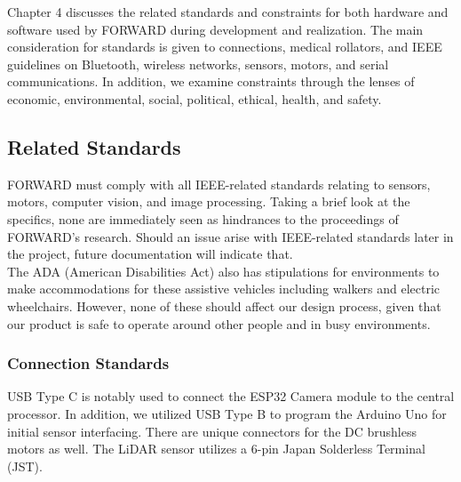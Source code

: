 \noindent Chapter 4 discusses the related standards and constraints for both hardware and software used by FORWARD during development and realization. The main consideration for standards is given to connections, medical rollators, and IEEE guidelines on Bluetooth, wireless networks, sensors, motors, and serial communications. In addition, we examine constraints through the lenses of economic, environmental, social, political, ethical, health, and safety.

\subsection{Related Standards}
\noindent FORWARD must comply with all IEEE-related standards relating to sensors, motors, computer vision, and image processing. Taking a brief look at the specifics, none are immediately seen as hindrances to the proceedings of FORWARD’s research. Should an issue arise with IEEE-related standards later in the project, future documentation will indicate that. \\

\noindent The ADA (American Disabilities Act) also has stipulations for environments to make accommodations for these assistive vehicles including walkers and electric wheelchairs. However, none of these should affect our design process, given that our product is safe to operate around other people and in busy environments.

\subsubsection{Connection Standards}
\noindent USB Type C is notably used to connect the ESP32 Camera module to the central processor. In addition, we utilized USB Type B to program the Arduino Uno for initial sensor interfacing. There are unique connectors for the DC brushless motors as well. The LiDAR sensor utilizes a 6-pin Japan Solderless Terminal (JST).

